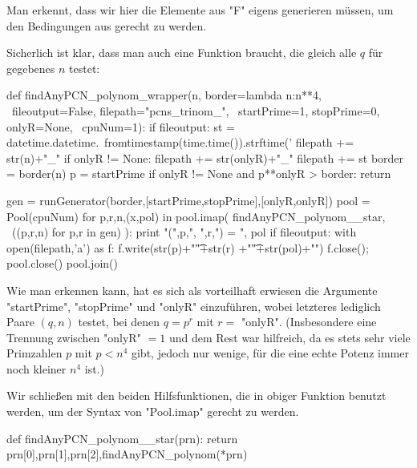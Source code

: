 Man erkennt, dass wir hier die Elemente aus "F" eigens generieren müssen, um
den Bedingungen aus  gerecht zu werden.

Sicherlich ist klar, dass man auch eine Funktion braucht, die gleich alle
$q$ für gegebenes $n$ testet:


\begin{sagecode}[caption={[\texttt{findAnyPCN\_polynom\_wrapper} aus 
 \url{../Sage/findAnyPCN_trinom.spyx}]Aus \url{../Sage/findAnyPCN_trinom.spyx}}]
def findAnyPCN_polynom_wrapper(n, border=lambda n:n**4, \
        fileoutput=False, filepath="pcns_trinom_", \
        startPrime=1, stopPrime=0, onlyR=None, \
        cpuNum=1):
    if fileoutput:
        st = datetime.datetime.\
                fromtimestamp(time.time()).strftime('%
        filepath += str(n)+"_"
        if onlyR != None: filepath += str(onlyR)+"_"
        filepath += st
    border = border(n)
    p = startPrime
    if onlyR != None and p**onlyR > border: return

    gen = runGenerator(border,[startPrime,stopPrime],[onlyR,onlyR])
    pool = Pool(cpuNum)
    for p,r,n,(x,pol) in pool.imap( findAnyPCN_polynom__star, \
            ((p,r,n) for p,r in gen) ):
        print "(",p,", ",r,") = ", pol
        if fileoutput:
            with open(filepath,'a') as f:
                f.write(str(p)+"\t"+str(r)
                        +"\t"+str(pol)+"\n")
            f.close();
    pool.close()
    pool.join()
\end{sagecode}

Wie man erkennen kann, hat es sich als vorteilhaft erwiesen die Argumente
"startPrime", "stopPrime" und "onlyR" einzuführen, wobei letzteres lediglich
Paare $(q,n)$ testet, bei denen $q = p^r$ mit $r=$ "onlyR". (Insbesondere eine
Trennung zwischen "onlyR" $=1$ und dem Rest war hilfreich, da es stets sehr
viele Primzahlen $p$ mit $p<n^4$ gibt, jedoch nur wenige, für die eine echte
Potenz immer noch kleiner $n^4$ ist.)


Wir schließen mit den beiden Hilfsfunktionen, die in obiger Funktion
benutzt werden, um der Syntax von "Pool.imap" gerecht zu werden.

\begin{sagecode}[caption={[\texttt{findAnyPCN\_polynom\_\_star} aus 
 \url{../Sage/findAnyPCN_trinom.spyx}]Aus \url{../Sage/findAnyPCN_trinom.spyx}}]
def findAnyPCN_polynom__star(prn):
    return prn[0],prn[1],prn[2],findAnyPCN_polynom(*prn)
\end{sagecode}


